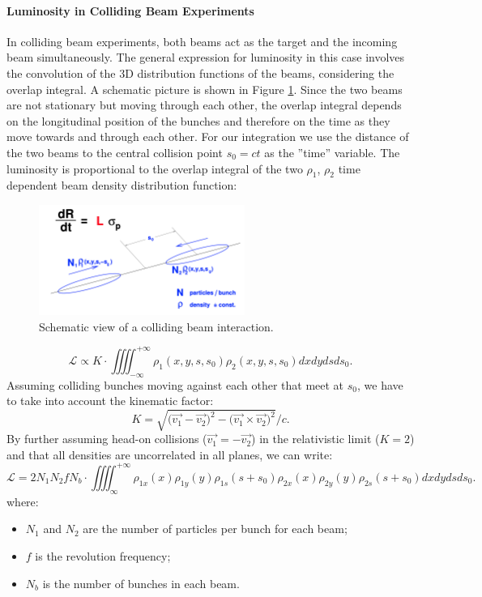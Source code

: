 \paragraph{Luminosity in Colliding Beam Experiments}
In colliding beam experiments, both beams act as the target and the incoming beam simultaneously. The general expression for luminosity in this case involves the convolution of the 3D distribution functions of the beams, considering the overlap integral. A schematic picture is shown in Figure \ref{fig:lumi-def}\cite{Herr:941318}. Since the two beams are not stationary but moving through each other, the overlap integral depends on the longitudinal position of the bunches and therefore on the time as they move towards and through each other. For our integration we use the distance of the two beams to the central collision point $s_0 = ct$ as the ”time” variable. 
The luminosity is proportional to the overlap integral of the two  $\rho_1$, $\rho_2$ time dependent beam density distribution function:

\begin{figure}
    \centering
    \includegraphics[width=0.6\textwidth]{figures/luminosity_def.png}
    \caption{Schematic view of a colliding beam interaction.}
    \label{fig:lumi-def}
\end{figure}

\begin{equation}
    \mathcal{L} \propto K\cdot\iiiint_{-\infty}^{+\infty}\rho_1(x,y,s,s_0)\rho_2(x,y,s,s_0)dxdydsds_0.\label{lumi_propto}
\end{equation}
Assuming colliding bunches moving against each other that meet at $s_0$, we have to take into account the kinematic factor\cite{Moller}:
\begin{equation}
    K = \sqrt{\bigl(\vec{v_1}-\vec{v_2}\bigr)^2-\bigl(\vec{v_1} \times \vec{v_2}\bigr)^2}/c.
\end{equation}
By further assuming head-on collisions ($\vec{v_1}=-\vec{v_2}$) in the relativistic limit ($K=2$) and that all densities are uncorrelated in all planes, we can write:
\begin{equation}
        \mathcal{L} = 2 N_1 N_2 f N_b\cdot\iiiint_{\infty}^{+\infty}\rho_{1x}(x)\rho_{1y}(y)\rho_{1s}(s+s_0)\rho_{2x}(x)\rho_{2y}(y)\rho_{2s}(s+s_0)dxdydsds_0.\label{beam_overlap}
\end{equation}
where:
\begin{itemize}
    \item $ N_1$  and $N_2$  are the number of particles per bunch for each beam;
    \item $f$ is the revolution frequency;
    \item $N_b$  is the number of bunches in each beam.
\end{itemize}

